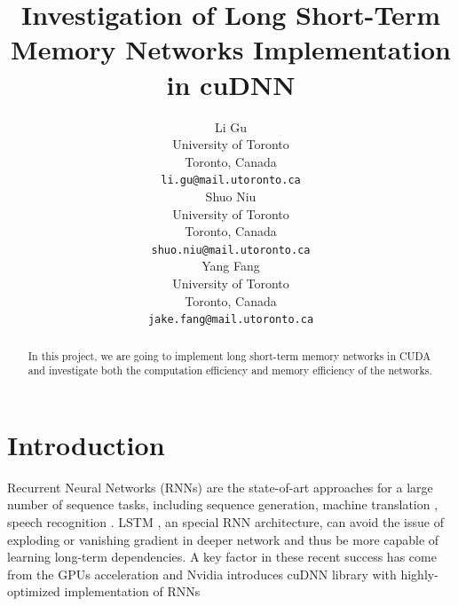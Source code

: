 \documentclass{article}
\title{Investigation of Long Short-Term Memory Networks Implementation in cuDNN}
\author{
  Li Gu \\
  University of Toronto \\
  Toronto, Canada \\
  \texttt{li.gu@mail.utoronto.ca} \\
  \And
  Shuo Niu \\
  University of Toronto \\
  Toronto, Canada \\
  \texttt{shuo.niu@mail.utoronto.ca} \\
  \And
  Yang Fang \\
  University of Toronto \\
  Toronto, Canada \\
  \texttt{jake.fang@mail.utoronto.ca} \\
}
\begin{document}

\maketitle
\begin{abstract}
  In this project, we are going to implement long short-term memory networks in CUDA 
  and investigate both the computation efficiency and memory efficiency of the networks.
\end{abstract}

\section{Introduction}







Recurrent Neural Networks (RNNs) are the state-of-art approaches for a large number of sequence tasks, including sequence generation\cite{eck2002first,sutskever2014sequence,gravessupervised}, machine translation \cite{cho2014learning,jean2015montreal,luong2015effective}, speech recognition \cite{graves2013speech}. LSTM \cite{hochreiter1997long}, an special RNN architecture, can avoid the issue of exploding or vanishing gradient \cite{pascanu2013difficulty} in deeper network and thus be more capable of learning long-term dependencies. A key factor in these recent success has come from the GPUs acceleration \cite{leonard2015rnn,weninger2015introducing} and Nvidia introduces cuDNN library\cite{chetlur2014cudnn} with highly-optimized implementation of RNNs\cite{appleyard2016optimizing} 
\end{document}
